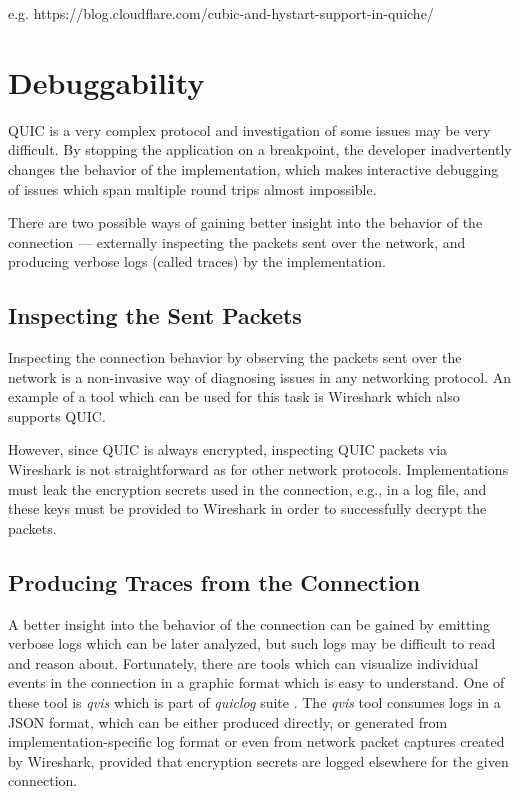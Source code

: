 
e.g. https://blog.cloudflare.com/cubic-and-hystart-support-in-quiche/

\section{Debuggability}

QUIC is a very complex protocol and investigation of some issues may be very difficult. By stopping
the application on a breakpoint, the developer inadvertently changes the behavior of the
implementation, which makes interactive debugging of issues which span multiple round trips almost
impossible.

There are two possible ways of gaining better insight into the behavior of the connection ---
externally inspecting the packets sent over the network, and producing verbose logs (called traces)
by the implementation.

\subsection{Inspecting the Sent Packets}

Inspecting the connection behavior by observing the packets sent over the network is a non-invasive
way of diagnosing issues in any networking protocol. An example of a tool which can be used for this
task is Wireshark \cite{web:wireshark} which also supports QUIC.

However, since QUIC is always encrypted, inspecting QUIC packets via Wireshark is not
straightforward as for other network protocols. Implementations must leak the encryption secrets
used in the connection, e.g., in a log file, and these keys must be provided to Wireshark in order
to successfully decrypt the packets.

\subsection{Producing Traces from the Connection}

A better insight into the behavior of the connection can be gained by emitting verbose logs which
can be later analyzed, but such logs may be difficult to read and reason about. Fortunately, there
are tools which can visualize individual events in the connection in a graphic format which is easy
to understand. One of these tool is \textit{qvis} \cite{web:qvis} which is part of \textit{quiclog}
suite \cite{githubquiclog}. The \textit{qvis} tool consumes logs in a JSON format, which can be
either produced directly, or generated from implementation-specific log format or even from network
packet captures created by Wireshark, provided that encryption secrets are logged elsewhere for the
given connection.

